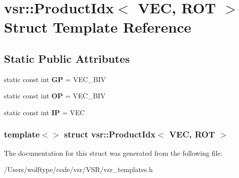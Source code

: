 \hypertarget{structvsr_1_1_product_idx_3_01_v_e_c_00_01_r_o_t_01_4}{\section{vsr\-:\-:Product\-Idx$<$ V\-E\-C, R\-O\-T $>$ Struct Template Reference}
\label{structvsr_1_1_product_idx_3_01_v_e_c_00_01_r_o_t_01_4}
}
\subsection*{Static Public Attributes}
\begin{DoxyCompactItemize}
\item 
\hypertarget{structvsr_1_1_product_idx_3_01_v_e_c_00_01_r_o_t_01_4_afc43d83fa649699ba613a20770b5155b}{static const int {\bfseries G\-P} = V\-E\-C\-\_\-\-B\-I\-V}\label{structvsr_1_1_product_idx_3_01_v_e_c_00_01_r_o_t_01_4_afc43d83fa649699ba613a20770b5155b}

\item 
\hypertarget{structvsr_1_1_product_idx_3_01_v_e_c_00_01_r_o_t_01_4_acfbe13683273885e73ff0b55003b6425}{static const int {\bfseries O\-P} = V\-E\-C\-\_\-\-B\-I\-V}\label{structvsr_1_1_product_idx_3_01_v_e_c_00_01_r_o_t_01_4_acfbe13683273885e73ff0b55003b6425}

\item 
\hypertarget{structvsr_1_1_product_idx_3_01_v_e_c_00_01_r_o_t_01_4_af0686dc075b772c7b43ba55309af945c}{static const int {\bfseries I\-P} = V\-E\-C}\label{structvsr_1_1_product_idx_3_01_v_e_c_00_01_r_o_t_01_4_af0686dc075b772c7b43ba55309af945c}

\end{DoxyCompactItemize}
\subsubsection*{template$<$$>$ struct vsr\-::\-Product\-Idx$<$ V\-E\-C, R\-O\-T $>$}



The documentation for this struct was generated from the following file\-:\begin{DoxyCompactItemize}
\item 
/\-Users/wolftype/code/vsr/\-V\-S\-R/vsr\-\_\-templates.\-h\end{DoxyCompactItemize}
